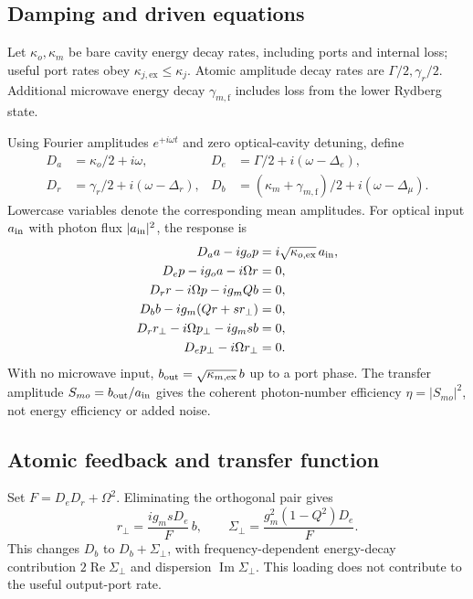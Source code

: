 \documentclass[aps,pra,onecolumn,10pt,letterpaper,notitlepage,nofootinbib,amsmath,amssymb]{revtex4-2}
\newcommand{\Om}{\Omega}
\newcommand{\gadd}{\gamma_{m,\mathrm{f}}}
\begin{document}
\subsection{Damping and driven equations}
Let $\kappa_o,\kappa_m$ be bare cavity energy decay rates, including ports and
internal loss; useful port rates obey $\kappa_{j,\mathrm{ex}}\leq\kappa_j$.
Atomic amplitude decay rates are $\Gamma/2,\gamma_r/2$.
Additional microwave energy decay $\gadd$ includes loss from the lower Rydberg state.

Using Fourier amplitudes $e^{+i\omega t}$ and zero optical-cavity detuning, define
\begin{equation}
 \begin{aligned}
 D_a&=\kappa_o/2+i\omega,&
 D_e&=\Gamma/2+i(\omega-\Delta_e),\\
 D_r&=\gamma_r/2+i(\omega-\Delta_r),&
 D_b&=(\kappa_m+\gadd)/2+i(\omega-\Delta_\mu).
 \end{aligned}
 \label{eq:D}
\end{equation}
Lowercase variables denote the corresponding mean amplitudes.
For optical input $a_{\rm in}$ with photon flux $|a_{\rm in}|^2$, the response is
\begin{equation}
 \begin{aligned}
 D_a a-i g_o p &=i\sqrt{\kappa_{o,\mathrm{ex}}}\,a_{\rm in},\\
 D_e p-i g_o a-i\Om r&=0,\\
 D_r r-i\Om p-i g_m Qb&=0,\\
 D_b b-i g_m(Qr+s r_\perp)&=0,\\
 D_r r_\perp-i\Om p_\perp-i g_m s b&=0,\\
 D_e p_\perp-i\Om r_\perp&=0.
 \end{aligned}
 \label{eq:six}
\end{equation}
With no microwave input, $b_{\rm out}=\sqrt{\kappa_{m,\mathrm{ex}}}\,b$ up to a
port phase. The transfer amplitude $S_{mo}=b_{\rm out}/a_{\rm in}$ gives the coherent
photon-number efficiency $\eta=|S_{mo}|^2$, not energy efficiency or added noise.

\subsection{Atomic feedback and transfer function}
Set $F=D_eD_r+\Om^2$. Eliminating the orthogonal pair gives
\begin{equation}
 r_\perp=\frac{i g_m s D_e}{F}\,b,\qquad
 \Sigma_\perp=\frac{g_m^2(1-Q^2)D_e}{F}.
 \label{eq:sigma}
\end{equation}
This changes $D_b$ to $D_b+\Sigma_\perp$, with frequency-dependent energy-decay
contribution $2\operatorname{Re}\Sigma_\perp$ and dispersion $\operatorname{Im}\Sigma_\perp$.
This loading does not contribute to the useful output-port rate.
\end{document}
